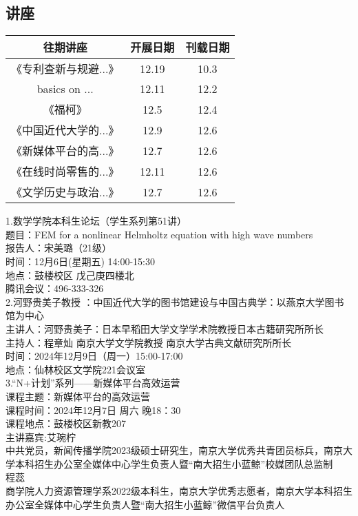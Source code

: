 \documentclass[letterpaper, 12pt]{article}
\begin{document}
\begin{multicols}{2}

\section{讲座}
\begin{tabular}{|c|c|c|}
    \hline
    往期讲座 & 开展日期 & 刊载日期\\
    \hline\hline
    《专利查新与规避...》 & 12.19 & 10.3\\
    basics on ... & 12.11 & 12.2\\
    《福柯》 & 12.5 & 12.4\\
    《中国近代大学的...》 & 12.9 & 12.6\\
    《新媒体平台的高...》 & 12.7 & 12.6\\
    《在线时尚零售的...》 & 12.11 & 12.6\\
    《文学历史与政治...》 & 12.7 & 12.6\\
    \hline
\end{tabular}

1.数学学院本科生论坛（学生系列第51讲）\\
题目：FEM for a nonlinear Helmholtz equation with high wave numbers\\
报告人：宋美璐（21级）\\
时间：12月6日(星期五) 14:00-15:30\\
地点：鼓楼校区 戊己庚四楼北\\
腾讯会议：496-333-326\\

2.河野贵美子教授 ：中国近代大学的图书馆建设与中国古典学：以燕京大学图书馆为中心\\
主讲人：河野贵美子：日本早稻田大学文学学术院教授日本古籍研究所所长\\
主持人：程章灿 南京大学文学院教授 南京大学古典文献研究所所长\\
时间：2024年12月9日（周一）15:00-17:00\\
地点：仙林校区文学院221会议室\\

3.“N+计划”系列——新媒体平台高效运营\\
课程主题：新媒体平台的高效运营\\
课程时间：2024年12月7日 周六 晚18：30\\
课程地点：鼓楼校区新教207\\
主讲嘉宾:艾琬柠\\
中共党员，新闻传播学院2023级硕士研究生，南京大学优秀共青团员标兵，南京大学本科招生办公室全媒体中心学生负责人暨“南大招生小蓝鲸”校媒团队总监制\\
程蕊\\
商学院人力资源管理学系2022级本科生，南京大学优秀志愿者，南京大学本科招生办公室全媒体中心学生负责人暨“南大招生小蓝鲸”微信平台负责人\\


\end{multicols}
\end{document}

